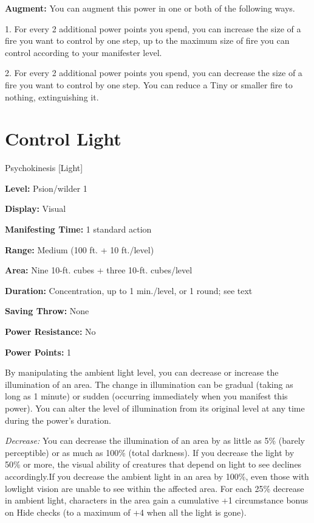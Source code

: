 \documentclass{article}
\begin{document}
\vspace{12pt}
\textbf{Augment:} You can augment this power in one or both of the following ways.

1. For every 2 additional power points you spend, you can increase the size of 
a fire you want to control by one step, up to the maximum size of fire you can 
control according to your manifester level.

2. For every 2 additional power points you spend, you can decrease the size of 
a fire you want to control by one step. You can reduce a Tiny or smaller fire to 
nothing, extinguishing it.

\vspace{12pt}
\section*{Control Light}

Psychokinesis [Light]

\textbf{Level:} Psion/wilder 1

\textbf{Display:} Visual

\textbf{Manifesting Time:} 1 standard action

\textbf{Range:} Medium (100 ft. + 10 ft./level)

\textbf{Area:} Nine 10-ft. cubes + three 10-ft. cubes/level

\textbf{Duration:} Concentration, up to 1 min./level, or 1 round; see text

\textbf{Saving Throw:} None

\textbf{Power Resistance:} No

\textbf{Power Points:} 1

By manipulating the ambient light level, you can decrease or increase the illumination 
of an area. The change in illumination can be gradual (taking as long as 1 minute) 
or sudden (occurring immediately when you manifest this power). You can alter the 
level of illumination from its original level at any time during the power's duration.

\textit{Decrease: }You can decrease the illumination of an area by as little as 
5\% (barely perceptible) or as much as 100\% (total darkness). If you decrease 
the light by 50\% or more, the visual ability of creatures that depend on light 
to see declines accordingly.If you decrease the ambient light in an area by 100\%, 
even those with lowlight vision are unable to see within the affected area. For 
each 25\% decrease in ambient light, characters in the area gain a cumulative +1 
circumstance bonus on Hide checks (to a maximum of +4 when all the light is gone).
\end{document}
